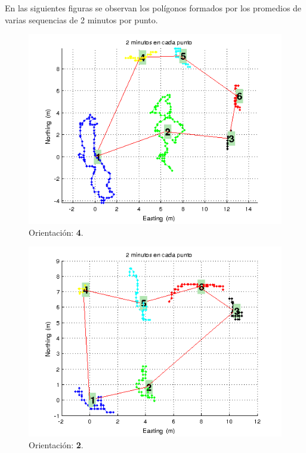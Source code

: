 \documentclass[spanish,12pt,a4paper,titlepage]{report}
\begin{document}
En las siguientes figuras se observan los polígonos formados por los promedios de varias sequencias de 2 minutos por punto. 

\newpage
\begin{figure}[h!]
  \centering
  \includegraphics[width=.75\textwidth]{./img/2m_or1_pol.png}
  \caption{Orientación: \textbf{4}.}
\vspace{-30pt}
  \label{fig:2m_or1_pol.png}
\end{figure}

\begin{figure}[h!]
  \centering
  \includegraphics[width=.75\textwidth]{./img/2m_or2_pol.png}
  \caption{Orientación: \textbf{2}.}
\vspace{-30pt}
  \label{fig:2m_or2_pol.png}
\end{figure}
\end{document}
